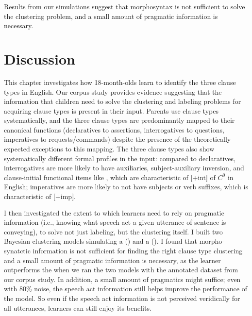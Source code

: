 Results from our simulations suggest that morphosyntax is not sufficient to solve the clustering problem, and a small amount of pragmatic information is necessary.

\section{Discussion}
\label{sec:engcl:discussion}

This chapter investigates how 18-month-olds learn to identify the three clause types in English. Our corpus study provides evidence suggesting that the information that children need to solve the clustering and labeling problems for acquiring clause types is present in their input. Parents use clause types systematically, and the three clause types are predominantly mapped to their canonical functions (declaratives to assertions, interrogatives to questions, imperatives to requests/commands) despite the presence of the theoretically expected exceptions to this mapping. The three clause types also show systematically different formal profiles in the input: compared to declaratives, interrogatives are more likely to have auxiliaries, subject-auxiliary inversion, and clause-initial functional items like \twh{}, which are characteristic of [+int] of $C^{0}$ in English; imperatives are more likely to not have subjects or verb suffixes, which is characteristic of [+imp].


I then investigated the extent to which learners need to rely on pragmatic information (i.e., knowing what speech act a given utterance of sentence is conveying), to solve not just labeling, but the clustering itself. I built two Bayesian clustering models simulating a \distlearner{} (\dlearnerabbr{}) and a \praglearner{} (\plearnerabbr{}). I found that morpho-synatctic information is not sufficient for finding the right clause type clustering and a small amount of pragmatic information is necessary, as the \plearnerabbr{} learner outperforms the \dlearnerabbr{} when we ran the two models with the annotated dataset from our corpus study. In addition, a small amount of pragmatics might suffice; even with 80\% noise, the speech act information still helps improve the performance of the model. So even if the speech act information is not perceived veridically for all utterances, learners can still enjoy its benefits.

\subsection{}

